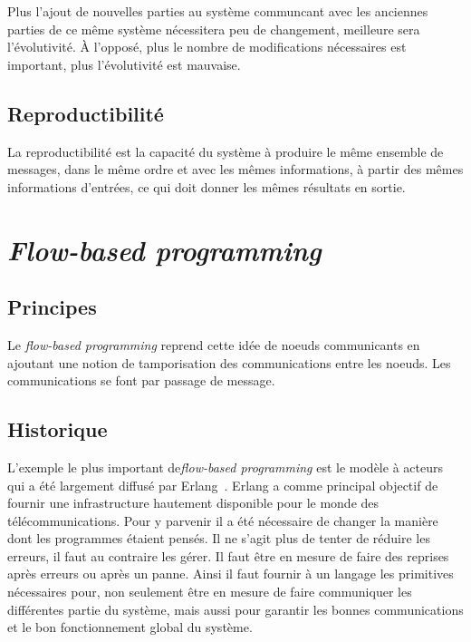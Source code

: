 \documentclass{article}
\begin{document}
Plus l'ajout de nouvelles parties au système communcant avec les anciennes parties
de ce même système nécessitera peu de changement, meilleure sera l'évolutivité.
À l'opposé, plus le nombre de modifications nécessaires est important, plus l'évolutivité
est mauvaise.

\subsection{Reproductibilité}
La reproductibilité est la capacité du système à produire le même ensemble de messages,
dans le même ordre et avec les mêmes informations, à partir des mêmes informations d'entrées,
ce qui doit donner les mêmes résultats en sortie.


\section{\emph{Flow-based programming}}\label{flow-based}

\subsection{Principes}\label{principes}

Le \emph{flow-based programming} reprend cette idée de noeuds
communicants en ajoutant une notion de tamporisation des communications
entre les noeuds. Les communications se font par passage de message.

\subsection{Historique}\label{historique}
L'exemple le plus important de\emph{flow-based programming} est le modèle à acteurs~\cite{actors}
qui a été largement diffusé par Erlang~\cite{erlang}.
Erlang a comme principal objectif de fournir une infrastructure hautement disponible
pour le monde des télécommunications.
Pour y parvenir il a été nécessaire de changer la manière dont les programmes étaient pensés.
Il ne s'agit plus de tenter de réduire les erreurs, il faut au contraire les gérer.
Il faut être en mesure de faire des reprises après erreurs ou après un panne.
Ainsi il faut fournir à un langage les primitives nécessaires pour, non seulement
être en mesure de faire communiquer les différentes partie du système, mais aussi
pour garantir les bonnes communications et le bon fonctionnement global du système.
\end{document}
